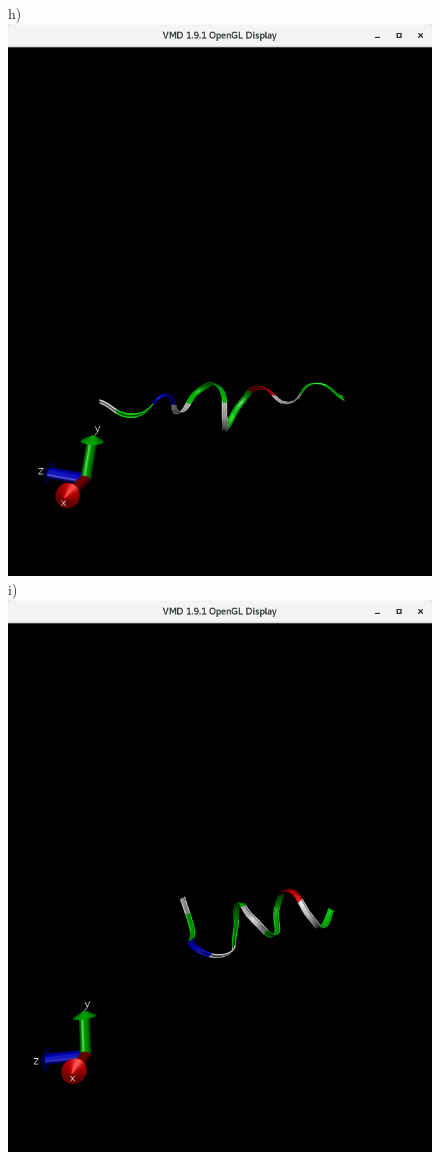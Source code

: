 \documentclass[12pt, onecolumn]{revtex4}    %
\begin{document}
\begin{figure}[h!]
h)\includegraphics[scale=0.15]{Last0001}
i)\includegraphics[scale=0.15]{Last00001}

\end{figure}
\end{document}
